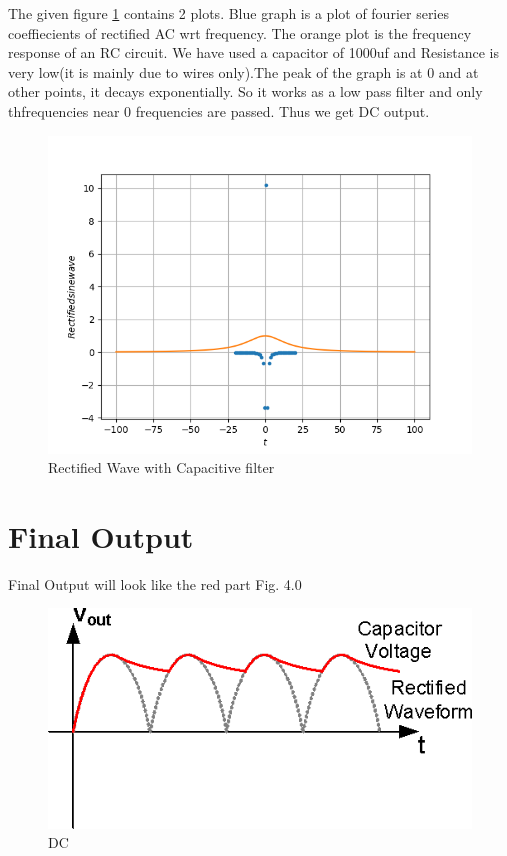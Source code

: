 \documentclass[journal,12pt,twocolumn]{IEEEtran}
\begin{document}
\begin{problem}
The given figure \ref{fig3} contains 2 plots. Blue graph is  a plot of fourier series coeffiecients of rectified AC wrt frequency. The orange plot is the frequency response of an RC circuit. We have used a capacitor of 1000uf and Resistance is very low(it is mainly due to wires only).The peak of the graph is at 0 and at other points, it decays exponentially. So it works as a low pass filter and only thfrequencies near 0 frequencies are passed. Thus we get DC output. 


\begin{figure}[h]
\centering
	\includegraphics[scale=0.4]{./figs/dc.png}
	\caption{Rectified Wave with Capacitive filter}  \label{fig3}
    \end{figure}
\end{problem}
\section{Final Output}
Final Output will look like the red part Fig. 4.0
\begin{figure}[h]
\centering
	\includegraphics[scale=0.4]{./figs/cap.png}
	\caption{DC }  \label{fig5}
    \end{figure}
\end{document}
